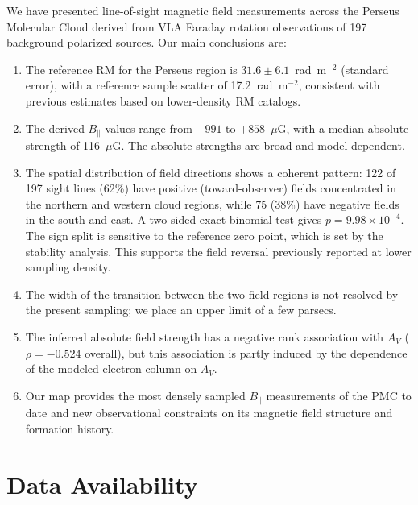 \documentclass[twocolumn]{aastex701}
\begin{document}
We have presented line-of-sight magnetic field measurements across the Perseus
Molecular Cloud derived from VLA Faraday rotation observations of 197
background polarized sources. Our main conclusions are:

\begin{enumerate}
    \item The reference RM for the Perseus region is
    $31.6 \pm 6.1$~rad~m$^{-2}$ (standard error), with a reference sample
    scatter of 17.2~rad~m$^{-2}$, consistent with previous estimates based on
    lower-density RM catalogs.

    \item The derived $B_\parallel$ values range from $-991$ to
    $+858$~$\mu$G, with a median absolute strength of 116~$\mu$G. The
    absolute strengths are broad and model-dependent.

    \item The spatial distribution of field directions shows a coherent
    pattern: 122 of 197 sight lines (62\%) have positive (toward-observer)
    fields concentrated in the northern and western cloud regions, while 75
    (38\%) have negative fields in the south and east. A two-sided exact
    binomial test gives $p=9.98\times10^{-4}$. The sign split is sensitive to
    the reference zero point, which is set by the stability analysis. This
    supports the field reversal previously reported at
    lower sampling density.

    \item The width of the transition between the two field regions is not
    resolved by the present sampling; we place an upper limit of a few
    parsecs.

    \item The inferred absolute field strength has a negative rank association
    with $A_V$ ($\rho=-0.524$ overall), but this association is partly induced
    by the dependence of the modeled electron column on $A_V$.

    \item Our map provides the most densely sampled $B_\parallel$
    measurements of the PMC to date and new observational constraints on its
    magnetic field structure and formation history.
\end{enumerate}

\section{Data Availability}
\end{document}
